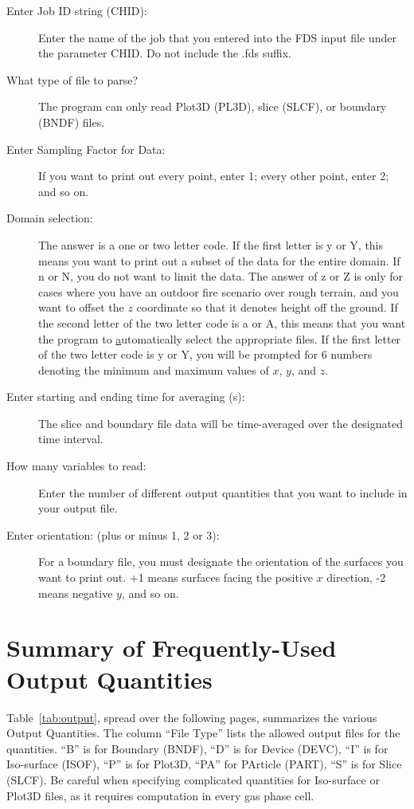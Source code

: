 \documentclass[11pt]{book}
\begin{document}
\begin{description}
\item[Enter Job ID string (CHID):] Enter the name of the job that you entered into the FDS input file under the parameter {\ct CHID}. Do not include the {\ct .fds} suffix.
\item[What type of file to parse?] The program can only read Plot3D ({\ct PL3D}), slice ({\ct SLCF}), or boundary ({\ct BNDF}) files.
\item[Enter Sampling Factor for Data:] If you want to print out every point, enter 1; every other point, enter 2; and so on.
\item[Domain selection:] The answer is a one or two letter code. If the first letter is {\ct y} or {\ct Y}, this means you want to print out a subset of the data for the entire domain. If {\ct n} or {\ct N}, you do not want to limit the data. The answer of {\ct z} or {\ct Z} is only for cases where you have an outdoor fire scenario over rough terrain, and you want to offset the $z$ coordinate so that it denotes height off the ground. If the second letter of the two letter code is {\ct a} or {\ct A}, this means that you want the program to \underline{a}utomatically select the appropriate files. If the first letter of the two letter code is {\ct y} or {\ct Y}, you will be prompted for 6 numbers denoting the minimum and maximum values of $x$, $y$, and $z$.
\item[Enter starting and ending time for averaging (s):] The slice and boundary file data will be time-averaged over the designated time interval.
\item[How many variables to read:] Enter the number of different output quantities that you want to include in your output file.
\item[Enter orientation: (plus or minus 1, 2 or 3):] For a boundary file, you must designate the orientation of the surfaces you want to print out. +1 means surfaces facing the positive $x$ direction, -2 means negative $y$, and so on.
\end{description}



\section{Summary of Frequently-Used Output Quantities}
\label{info:outputquantities}

Table~\ref{tab:output}, spread over the following pages, summarizes the various Output Quantities. The column ``File Type'' lists the allowed output files for the quantities. ``B'' is for Boundary ({\ct BNDF}), ``D'' is for Device ({\ct DEVC}), ``I'' is for Iso-surface ({\ct ISOF}), ``P'' is for Plot3D, ``PA'' for PArticle ({\ct PART}), ``S'' is for Slice ({\ct SLCF}). Be careful when specifying complicated quantities for Iso-surface or Plot3D files, as it requires computation in every gas phase cell.
\end{document}
